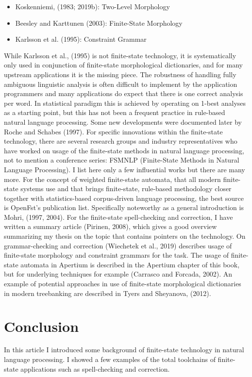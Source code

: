 \documentclass[free]{flammie}
\begin{document}
\begin{itemize}
    \item Koskenniemi, (1983; 2019b): Two-Level Morphology
    \item Beesley and Karttunen (2003): Finite-State Morphology
    \item Karlsson et al. (1995): Constraint Grammar
\end{itemize}

While Karlsson et al., (1995) is not finite-state technology, it is systematically only used in
conjunction of finite-state morphological dictionaries, and for many upstream applications
it is the missing piece. The robustness of handling fully ambiguous linguistic analysis is
often difficult to implement by the application programmers and many applications do
expect that there is one correct analysis per word. In statistical paradigm this is achieved
by operating on 1-best analyses as a starting point, but this has not been a frequent practice
in rule-based natural language processing. Some new developments were documented later
by Roche and Schabes (1997).
For specific innovations within the finite-state technology, there are several research
groups and industry representatives who have worked on usage of the finite-state methods
in natural language processing, not to mention a conference series: FSMNLP (Finite-State
Methods in Natural Language Processing). I list here only a few influential works but there
are many more. For the concept of weighted finite-state automata, that all modern finite-
state systems use and that brings finite-state, rule-based methodology closer together with
statistics-based corpus-driven language processing, the best source is OpenFst’s
publication list. Specifically noteworthy as a general introduction is Mohri, (1997, 2004).
For the finite-state spell-checking and correction, I have written a summary article (Pirinen,
2008), which gives a good overview summarizing my thesis on the topic that contains
pointers on the technology. On grammar-checking and correction (Wiechetek et al., 2019)
describes usage of finite-state morphology and constraint grammars for the task. The usage
of finite-state automata in Apertium is described in the Apertium chapter of this book, but
for underlying techniques for example (Carrasco and Forcada, 2002). An example of
potential approaches in use of finite-state morphological dictionaries in modern
treebanking are described in Tyers and Sheyanova, (2012).

\section{Conclusion}

In this article I introduced some background of finite-state technology in natural language
processing. I showed a few examples of the total toolchains of finite-state applications such
as spell-checking and correction.




\end{document}
